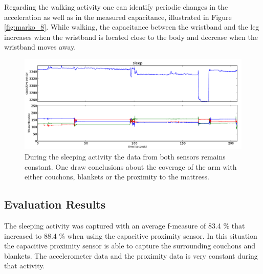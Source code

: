 \documentclass[runningheads,a4paper]{llncs}
\begin{document}
Regarding the walking activity one can identify periodic changes in the acceleration as well as in the measured capacitance, illustrated in Figure \ref{fig:marko_8}. While walking, the capacitance between the wristband and the leg increases when the wristband is located close to the body and decrease when the wristband moves away. 

\begin{figure}
	\centering
		\includegraphics[width=1.00\textwidth]{../Auswertung/images/eugen_9.pdf}
	\caption{During the sleeping activity the data from both sensors remains constant. One draw conclusions about the coverage of the arm with either couchons, blankets or the proximity to the mattress.}
	\label{fig:eugen_9}
\end{figure}

\subsection{Evaluation Results}
\label{sect:evaluation}

The sleeping activity was captured with an average f-measure of 83.4 \% that increased to 88.4 \% when using the capacitive proximity sensor. In this situation the capacitive proximity sensor is able to capture the surrounding couchons and blankets. The accelerometer data and the proximity data is very constant during that activity. 
\end{document}

